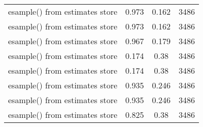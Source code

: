 \begin{table}[htbp]
\begin{tabular}{l c c  c}
esample() from estimates store & 0.973 & 0.162  & 3486\\
esample() from estimates store & 0.973 & 0.162  & 3486\\
esample() from estimates store & 0.967 & 0.179  & 3486\\
esample() from estimates store & 0.174 & 0.38  & 3486\\
esample() from estimates store & 0.174 & 0.38  & 3486\\
esample() from estimates store & 0.935 & 0.246  & 3486\\
esample() from estimates store & 0.935 & 0.246  & 3486\\
esample() from estimates store & 0.825 & 0.38  & 3486\\
\hline\end{tabular}
\end{table}

